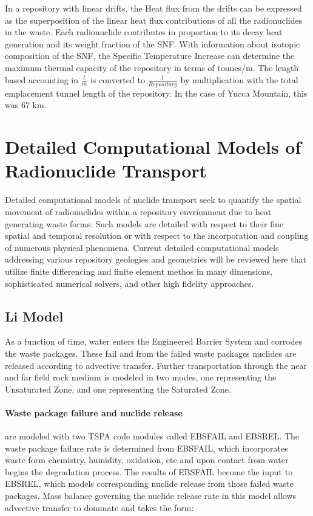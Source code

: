 {In a repository with linear drifts, the Heat flux from the drifts can be
expressed as the superposition of the linear heat flux contributions of all the
radionuclides in the waste. Each radionuclide contributes in proportion to its
decay heat generation and its weight fraction of the SNF. With information
about isotopic composition of the SNF, the Specific Temperature Increase can
determine the maximum thermal capacity of the repository in terms of tonnes/m.
The length based accounting in $\frac{t}{m}$ is converted to
$\frac{t}{Repository}$ by multiplication with the total emplacement tunnel
length of the repository.  In the case of Yucca Mountain, this was 67 km.

\section{Detailed Computational Models of Radionuclide Transport}
\label{sec:detailed_nuclide}

Detailed computational models of nuclide transport seek to quantify the spatial 
movement of radionuclides within a repository envrionment due to heat 
generating waste forms. Such models are detailed with respect to their fine 
spatial and temporal resolution or with respect to the incorporation and 
coupling of numerous physical phenomena. Current detailed computational models 
addressing various repository geologies and geometries will be reviewed here 
that utilize finite differencing and finite element methos in many dimensions, 
sophisticated numerical solvers, and other high fidelity approaches.



\subsection{Li Model\cite{li_methodology_2006}} As a function of time, water
enters the Engineered Barrier System and corrodes the waste packages.  These
fail and from the failed waste packages nuclides are released according to
advective transfer.  Further transportation through the near and far field rock
medium is modeled in two modes, one representing the Unsaturated Zone, and one
representing the Saturated Zone.

\paragraph{Waste package failure and nuclide release} are modeled with two TSPA
code modules called EBSFAIL and EBSREL. The waste package failure rate is
determined from EBSFAIL, which incorporates waste form chemistry, humidity,
oxidation, etc and upon contact from water begins the degradation process. The
results of EBSFAIL become the input to EBSREL, which models corresponding
nuclide release from those failed waste packages. Mass balance governing the
nuclide release rate in this model allows advective transfer to dominate and
takes the form:

}
